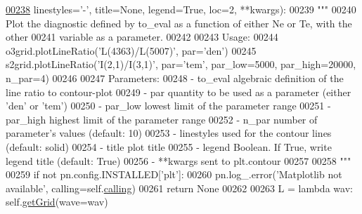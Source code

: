 \begin{DoxyCode}
\hypertarget{classpyneb_1_1core_1_1emis_grid_1_1_emis_grid_l00238}{}\hyperlink{classpyneb_1_1core_1_1emis_grid_1_1_emis_grid_a26aabc41fbb077d204e64f379e5ec5f7}{00238}                       linestyles=\textcolor{stringliteral}{'-'}, title=\textcolor{keywordtype}{None}, legend=\textcolor{keyword}{True}, loc=2, **kwargs):
00239         \textcolor{stringliteral}{"""}
00240 \textcolor{stringliteral}{        Plot the diagnostic defined by to\_eval as a function of either Ne or Te, with the other}
00241 \textcolor{stringliteral}{        variable as a parameter.}
00242 \textcolor{stringliteral}{        }
00243 \textcolor{stringliteral}{        Usage:}
00244 \textcolor{stringliteral}{            o3grid.plotLineRatio('L(4363)/L(5007)', par='den')}
00245 \textcolor{stringliteral}{            s2grid.plotLineRatio('I(2,1)/I(3,1)', par='tem', par\_low=5000, par\_high=20000, n\_par=4)}
00246 \textcolor{stringliteral}{        }
00247 \textcolor{stringliteral}{        Parameters:}
00248 \textcolor{stringliteral}{            - to\_eval      algebraic definition of the line ratio to contour-plot}
00249 \textcolor{stringliteral}{            - par          quantity to be used as a parameter (either 'den' or 'tem')}
00250 \textcolor{stringliteral}{            - par\_low      lowest limit of the parameter range}
00251 \textcolor{stringliteral}{            - par\_high     highest limit of the parameter range}
00252 \textcolor{stringliteral}{            - n\_par        number of parameter's values (default: 10)}
00253 \textcolor{stringliteral}{            - linestyles   used for the contour lines (default: solid)}
00254 \textcolor{stringliteral}{            - title        plot title}
00255 \textcolor{stringliteral}{            - legend       Boolean. If True, write legend title (default: True) }
00256 \textcolor{stringliteral}{            - **kwargs     sent to plt.contour}
00257 \textcolor{stringliteral}{            }
00258 \textcolor{stringliteral}{        """} 
00259         \textcolor{keywordflow}{if} \textcolor{keywordflow}{not} pn.config.INSTALLED[\textcolor{stringliteral}{'plt'}]:
00260             pn.log\_.error(\textcolor{stringliteral}{'Matplotlib not available'}, calling=self.\hyperlink{classpyneb_1_1core_1_1emis_grid_1_1_emis_grid_a19820878261ee98513e0b755e688453f}{calling})
00261             \textcolor{keywordflow}{return} \textcolor{keywordtype}{None}
00262 
00263         L = \textcolor{keyword}{lambda} wav: self.\hyperlink{classpyneb_1_1core_1_1emis_grid_1_1_emis_grid_af9a9219e5ddfcfd53c52466e2c2deb44}{getGrid}(wave=wav)

\end{DoxyCode}
